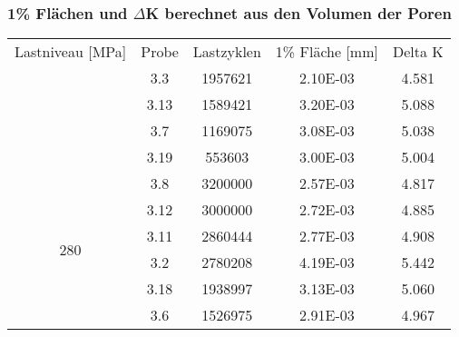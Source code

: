   \subsubsection{1\% Flächen und $\Delta$K berechnet aus den Volumen der Poren}
  \label{1pP mit Volumen}
    \begin{center}
    \begin{tabular}{ccccc}
    \thickhline
    Lastniveau {[}MPa{]} & Probe & Lastzyklen & 1\% Fläche {[}mm{]} & Delta K \\ \thickhline
    \multirow{4}{*}{300} & 3.3   & 1957621    & 2.10E-03            & 4.581   \\
                         & 3.13  & 1589421    & 3.20E-03            & 5.088   \\
                         & 3.7   & 1169075    & 3.08E-03            & 5.038   \\
                         & 3.19  & 553603     & 3.00E-03            & 5.004   \\ \hline
    \multirow{6}{*}{280} & 3.8   & 3200000    & 2.57E-03            & 4.817   \\
                         & 3.12  & 3000000    & 2.72E-03            & 4.885   \\
                         & 3.11  & 2860444    & 2.77E-03            & 4.908   \\
                         & 3.2   & 2780208    & 4.19E-03            & 5.442   \\
                         & 3.18  & 1938997    & 3.13E-03            & 5.060   \\
                         & 3.6   & 1526975    & 2.91E-03            & 4.967   \\ \hline
    \end{tabular}
    \end{center}
